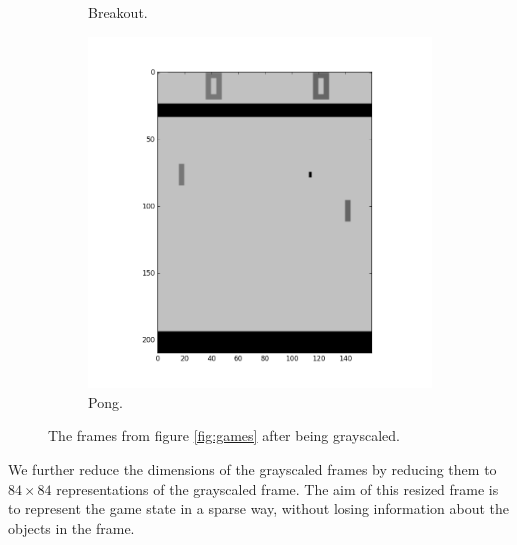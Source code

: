 \documentclass[11pt]{article}
\begin{document}
\begin{figure}[H]
\begin{subfigure}{.3\textwidth}
        \caption{Breakout.}
        \label{fig:scanlike}
    \end{subfigure}
    \begin{subfigure}{.3\textwidth}
        \centering
        \includegraphics[scale=0.25]{include/pong_1_gray.png}
        \caption{Pong.}
        \label{fig:scan}
    \end{subfigure}
    \caption{The frames from figure \ref{fig:games} after being grayscaled.}
     \label{fig:grays}
\end{figure}

We further reduce the dimensions of the grayscaled frames
by reducing them to $84 \times 84$ representations of the grayscaled
frame.
The aim of this resized frame is to represent the game state
in a sparse way, without losing information about the objects
in the frame.
\end{document}
